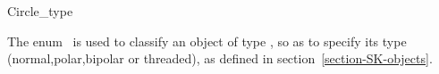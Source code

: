 \begin{ccRefEnum}{Circle_type}

\ccDefinition
  
The enum \ccRefName\ is used to classify an object of type , so as to specify 
its type (normal,polar,bipolar or threaded), as defined in section~\ref{section-SK-objects}.

{}

\ccSeeAlso



\end{ccRefEnum}
\ccModifierCrossRefOn